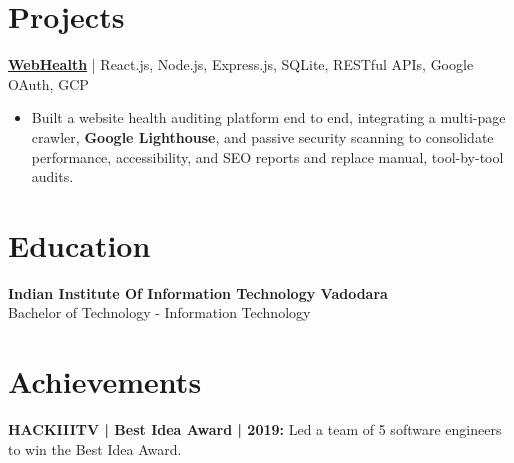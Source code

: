 \documentclass[a4paper,10pt]{article}
\begin{document}
\section{Projects}
\textbf{\href{https://web-health-eta.vercel.app/}{WebHealth}} | React.js, Node.js, Express.js, SQLite, RESTful APIs, Google OAuth, GCP
\begin{itemize}
\item Built a website health auditing platform end to end, integrating a multi-page crawler, \textbf{Google Lighthouse}, and passive security scanning to consolidate performance, accessibility, and SEO reports and replace manual, tool-by-tool audits.
\end{itemize}

\section{Education}
\textbf{Indian Institute Of Information Technology Vadodara}\\
Bachelor of Technology - Information Technology

\section{Achievements}
\textbf{HACKIIITV | Best Idea Award | 2019:} Led a team of 5 software engineers to win the Best Idea Award.
\end{document}
